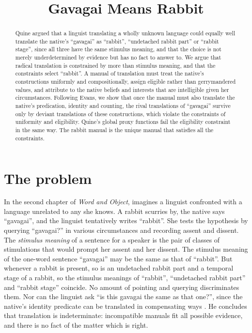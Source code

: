 \documentclass{situationist-preprint}
\title{Gavagai Means Rabbit}
\begin{document}
\maketitle

\begin{abstract}
Quine argued that a linguist translating a wholly unknown language could equally well translate the native's \enquote{gavagai} as \enquote{rabbit}, \enquote{undetached rabbit part} or \enquote{rabbit stage}, since all three have the same stimulus meaning, and that the choice is not merely underdetermined by evidence but has no fact to answer to. We argue that radical translation is constrained by more than stimulus meaning, and that the constraints select \enquote{rabbit}. A manual of translation must treat the native's constructions uniformly and compositionally, assign eligible rather than gerrymandered values, and attribute to the native beliefs and interests that are intelligible given her circumstances. Following Evans, we show that once the manual must also translate the native's predication, identity and counting, the rival translations of \enquote{gavagai} survive only by deviant translations of these constructions, which violate the constraints of uniformity and eligibility. Quine's global proxy functions fail the eligibility constraint in the same way. The rabbit manual is the unique manual that satisfies all the constraints.
\end{abstract}

\section{The problem}

In the second chapter of \emph{Word and Object}, \citet{Quine1960} imagines a linguist confronted with a language unrelated to any she knows. A rabbit scurries by, the native says \enquote{gavagai}, and the linguist tentatively writes \enquote{rabbit}. She tests the hypothesis by querying \enquote{gavagai?} in various circumstances and recording assent and dissent. The \emph{stimulus meaning} of a sentence for a speaker is the pair of classes of stimulations that would prompt her assent and her dissent. The stimulus meaning of the one-word sentence \enquote{gavagai} may be the same as that of \enquote{rabbit}. But whenever a rabbit is present, so is an undetached rabbit part and a temporal stage of a rabbit, so the stimulus meanings of \enquote{rabbit}, \enquote{undetached rabbit part} and \enquote{rabbit stage} coincide. No amount of pointing and querying discriminates them. Nor can the linguist ask \enquote{is this gavagai the same as that one?}, since the native's identity predicate can be translated in compensating ways \citep{Quine1960,Quine1969}. He concludes that translation is indeterminate: incompatible manuals fit all possible evidence, and there is no fact of the matter which is right.
\end{document}
